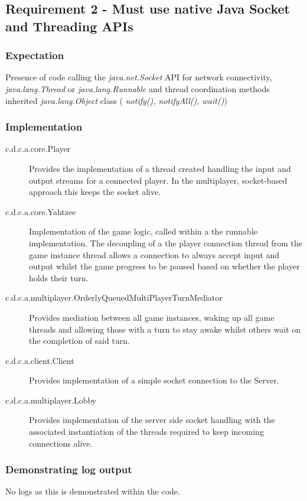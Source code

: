 \subsection{Requirement  2 - Must use native Java Socket and Threading APIs } 

\subsubsection{Expectation} 
 Presence of code calling the \textit{java.net.Socket} API for network connectivity, \textit{java.lang.Thread} or \textit{java.lang.Runnable} and thread coordination methods inherited \textit{java.lang.Object} class ( \textit{notify(), notifyAll(), wait()})

\subsubsection{Implementation}

\begin{description}
	\item[c.d.c.a.core.Player] Provides the implementation of a thread created handling the input and output streams for a connected player. In the multiplayer, socket-based approach this keeps the socket alive.
	
	\item[c.d.c.a.core.Yahtzee]  Implementation of the game logic, called within a the runnable implementation. The decoupling of a the player connection thread from the game instance thread allows a connection to always accept input and output whilst the game progress to be paused based on whether the player holds their turn.
	
	\item[c.d.c.a.multiplayer.OrderlyQueuedMultiPlayerTurnMediator] Provides mediation between all game instances, waking up all game threads and allowing those with a turn to stay awake whilst others wait on the completion of said turn.
	
	\item[c.d.c.a.client.Client] Provides implementation of a simple socket connection to the Server.
	
	\item[c.d.c.a.multiplayer.Lobby] Provides implementation of the server side socket handling with the associated instantiation of the threads required to keep incoming connections alive. 
	
\end{description} 

\subsubsection{Demonstrating log output} 

No logs as this is demonstrated within the code.